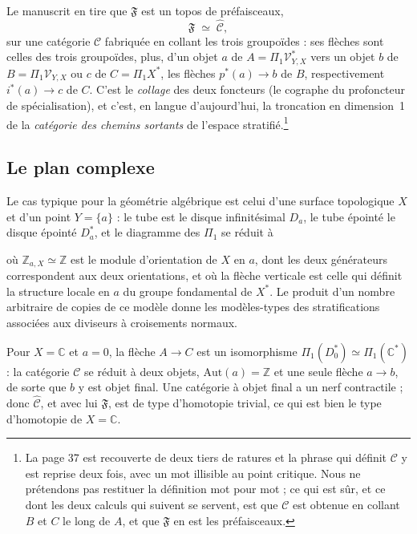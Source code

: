 \documentclass[11pt,a4paper]{article}
\begin{document}
Le manuscrit en tire que $\mathfrak{F}$ est un topos de préfaisceaux,
\[
  \mathfrak{F} \;\simeq\; \widehat{\mathcal{C}},
\]
sur une catégorie $\mathcal{C}$ fabriquée en collant les trois groupoïdes : ses
flèches sont celles des trois groupoïdes, plus, d'un objet $a$ de
$A = \Pi_{1}\mathcal{V}^{*}_{Y,X}$ vers un objet $b$ de
$B = \Pi_{1}\mathcal{V}_{Y,X}$ ou $c$ de $C = \Pi_{1}X^{*}$, les flèches
$p^{*}(a) \to b$ de $B$, respectivement $i^{*}(a) \to c$ de $C$. C'est le
\emph{collage} des deux foncteurs (le cographe du profoncteur de spécialisation),
et c'est, en langue d'aujourd'hui, la troncation en dimension~1 de la
\emph{catégorie des chemins sortants} de l'espace
stratifié.\footnote{La page 37 est recouverte de deux tiers de ratures et la
phrase qui définit $\mathcal{C}$ y est reprise deux fois, avec un mot illisible
au point critique. Nous ne prétendons pas restituer la définition mot pour mot ;
ce qui est sûr, et ce dont les deux calculs qui suivent se servent, est que
$\mathcal{C}$ est obtenue en collant $B$ et $C$ le long de $A$, et que
$\mathfrak{F}$ en est les préfaisceaux.}

\subsection*{Le plan complexe}

Le cas typique pour la géométrie algébrique est celui d'une surface topologique
$X$ et d'un point $Y = \{a\}$ : le tube est le disque infinitésimal $D_{a}$, le
tube épointé le disque épointé $D^{*}_{a}$, et le diagramme des $\Pi_{1}$ se
réduit à


où $\mathbb{Z}_{a,X} \simeq \mathbb{Z}$ est le module d'orientation de $X$ en
$a$, dont les deux générateurs correspondent aux deux orientations, et où la
flèche verticale est celle qui définit la structure locale en $a$ du groupe
fondamental de $X^{*}$. Le produit d'un nombre arbitraire de copies de ce modèle
donne les modèles-types des stratifications associées aux diviseurs à croisements
normaux.

Pour $X = \mathbb{C}$ et $a = 0$, la flèche $A \to C$ est un isomorphisme
$\Pi_{1}(D^{*}_{0}) \simeq \Pi_{1}(\mathbb{C}^{*})$ : la catégorie
$\mathcal{C}$ se réduit à deux objets, $\mathrm{Aut}(a) = \mathbb{Z}$ et une
seule flèche $a \to b$, de sorte que $b$ y est objet final. Une catégorie à
objet final a un nerf contractile ; donc $\widehat{\mathcal{C}}$, et avec lui
$\mathfrak{F}$, est de type d'homotopie trivial, ce qui est bien le type
d'homotopie de $X = \mathbb{C}$.
\end{document}
